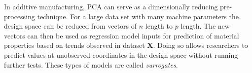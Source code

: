 In additive manufacturing, PCA can serve as a dimensionally reducing pre-processing technique. For a large data set with many machine parameters the design space can be reduced from vectors of $n$ length to $p$ length. The new vectors can then be used as regression model inputs for prediction of material properties based on trends observed in dataset $\mathbf{X}$. Doing so allows researchers to predict values at unobserved coordinates in the design space without running further tests. These types of models are called \textit{surrogates}.
